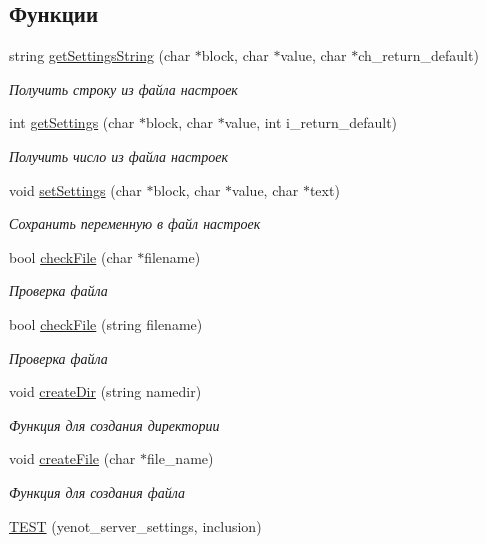 \subsection*{Функции}
\begin{DoxyCompactItemize}
\item 
string \mbox{\hyperlink{group__settingscpp_ga50535cebf45c8d7cbffd29274699e5f5}{get\+Settings\+String}} (char $\ast$block, char $\ast$value, char $\ast$ch\+\_\+return\+\_\+default)
\begin{DoxyCompactList}\small\item\em Получить строку из файла настроек \end{DoxyCompactList}\item 
int \mbox{\hyperlink{group__settingscpp_ga0a2fe94de4037eda33c49fe332970891}{get\+Settings}} (char $\ast$block, char $\ast$value, int i\+\_\+return\+\_\+default)
\begin{DoxyCompactList}\small\item\em Получить число из файла настроек \end{DoxyCompactList}\item 
void \mbox{\hyperlink{group__settingscpp_ga463e32ccb37f9478b0e62ee0d21c5999}{set\+Settings}} (char $\ast$block, char $\ast$value, char $\ast$text)
\begin{DoxyCompactList}\small\item\em Сохранить переменную в файл настроек \end{DoxyCompactList}\item 
bool \mbox{\hyperlink{group__settingscpp_ga2dd1bc039652a0480c444957d416b6a6}{check\+File}} (char $\ast$filename)
\begin{DoxyCompactList}\small\item\em Проверка файла \end{DoxyCompactList}\item 
bool \mbox{\hyperlink{group__settingscpp_ga64f8c9899c815dc180b2b564c0d05762}{check\+File}} (string filename)
\begin{DoxyCompactList}\small\item\em Проверка файла \end{DoxyCompactList}\item 
void \mbox{\hyperlink{group__settingscpp_ga5ac0cd45ecb6e65e3ace40687d6ee8bc}{create\+Dir}} (string namedir)
\begin{DoxyCompactList}\small\item\em Функция для создания директории \end{DoxyCompactList}\item 
void \mbox{\hyperlink{group__settingscpp_ga8f34a2030acfb5567678ab2bba25f3c1}{create\+File}} (char $\ast$file\+\_\+name)
\begin{DoxyCompactList}\small\item\em Функция для создания файла \end{DoxyCompactList}\item 
\mbox{\hyperlink{group__settingscpp_ga1313defba35762697f41324fbd47171d}{T\+E\+ST}} (yenot\+\_\+server\+\_\+settings, inclusion)
\end{DoxyCompactItemize}


